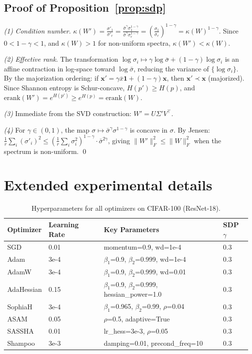 \documentclass{article}
\newcommand{\erank}{\mathrm{erank}}
\begin{document}


\subsection{Proof of Proposition~\ref{prop:sdp}}

\emph{(1) Condition number.} $\kappa(W') = \frac{\sigma'_1}{\sigma'_r} = \frac{\bar\sigma^\gamma \sigma_1^{1-\gamma}}{\bar\sigma^\gamma \sigma_r^{1-\gamma}} = \left(\frac{\sigma_1}{\sigma_r}\right)^{1-\gamma} = \kappa(W)^{1-\gamma}.$ Since $0 < 1-\gamma < 1$, and $\kappa(W) > 1$ for non-uniform spectra, $\kappa(W') < \kappa(W)$.

\emph{(2) Effective rank.} The transformation $\log\sigma_i \mapsto \gamma\log\bar\sigma + (1-\gamma)\log\sigma_i$ is an affine contraction in log-space toward $\log\bar\sigma$, reducing the variance of $\{\log\sigma_i\}$. By the majorization ordering: if $\bm{x}' = \gamma\bar{x}\bm{1} + (1-\gamma)\bm{x}$, then $\bm{x}' \prec \bm{x}$ (majorized). Since Shannon entropy is Schur-concave, $H(p') \geq H(p)$, and $\erank(W') = e^{H(p')} \geq e^{H(p)} = \erank(W)$.

\emph{(3)} Immediate from the SVD construction: $W' = U\Sigma'V^\top$.

\emph{(4)} For $\gamma \in (0,1)$, the map $\sigma \mapsto \bar\sigma^\gamma \sigma^{1-\gamma}$ is concave in $\sigma$. By Jensen: $\frac{1}{r}\sum_i (\sigma'_i)^2 \leq \left(\frac{1}{r}\sum_i \sigma_i^{2}\right)^{1-\gamma} \cdot \bar\sigma^{2\gamma}$, giving $\|W'\|_F^2 \leq \|W\|_F^2$ when the spectrum is non-uniform. \qed

\section{Extended experimental details}
\label{app:hyperparams}

\begin{table}[h]
\caption{Hyperparameters for all optimizers on CIFAR-100 (ResNet-18).}
\centering
\small
\begin{tabular}{@{}llll@{}}
\toprule
\textbf{Optimizer} & \textbf{Learning Rate} & \textbf{Key Parameters} & \textbf{SDP $\gamma$} \\
\midrule
SGD & 0.01 & momentum=0.9, wd=1e-4 & 0.3 \\
Adam & 3e-4 & $\beta_1$=0.9, $\beta_2$=0.999, wd=1e-4 & 0.3 \\
AdamW & 3e-4 & $\beta_1$=0.9, $\beta_2$=0.999, wd=0.01 & 0.3 \\
AdaHessian & 0.15 & $\beta_1$=0.9, $\beta_2$=0.999, hessian\_power=1.0 & 0.3 \\
SophiaH & 3e-4 & $\beta_1$=0.965, $\beta_2$=0.99, $\rho$=0.04 & 0.3 \\
ASAM & 0.05 & $\rho$=0.5, adaptive=True & 0.3 \\
SASSHA & 0.01 & lr\_hess=3e-3, $\rho$=0.05 & 0.3 \\
Shampoo & 3e-3 & damping=0.01, precond\_freq=10 & 0.3 \\
\bottomrule
\end{tabular}
\end{table}
\end{document}
